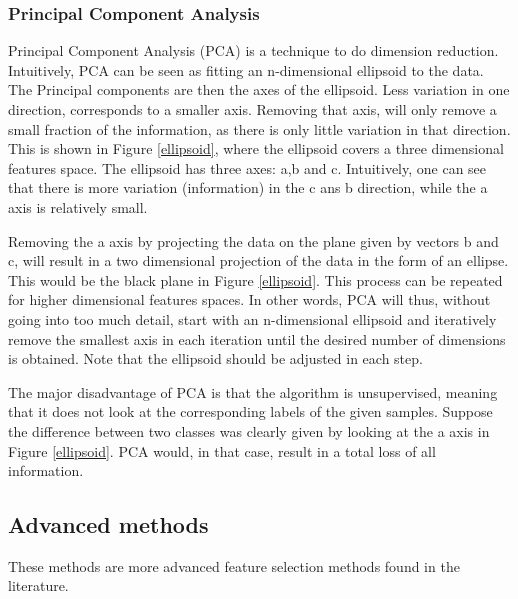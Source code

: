 
\subsubsection{Principal Component Analysis}
Principal Component Analysis (PCA)  is a technique to do dimension reduction. Intuitively, PCA can be seen as fitting an n-dimensional ellipsoid to the data. The Principal components are then the axes of the ellipsoid. Less variation in one direction, corresponds to a smaller axis. Removing that axis, will only remove a small fraction of the information, as there is only little variation in that direction. This is shown in Figure \ref{ellipsoid}, where the ellipsoid covers a three dimensional features space. The ellipsoid has three axes: a,b and c. Intuitively, one can see that there is more variation (information) in the c ans b direction, while the a axis is relatively small.


Removing the a axis by projecting the data on the plane given by vectors b and c, will result in a two dimensional projection of the data in the form of an ellipse. This would be the black plane in Figure \ref{ellipsoid}. This process can be repeated for higher dimensional features spaces. In other words, PCA will thus, without going into too much detail, start with an n-dimensional ellipsoid and iteratively remove the smallest axis in each iteration until the desired number of dimensions is obtained. Note that the ellipsoid should be adjusted in each step.

\npar

The major disadvantage of PCA is that the algorithm is unsupervised, meaning that it does not look at the corresponding labels of the given samples. Suppose the difference between two classes was clearly given by looking at the a axis in Figure \ref{ellipsoid}. PCA would, in that case, result in a total loss of all information.

\subsection{Advanced methods}
These methods are more advanced feature selection methods found in the literature.

